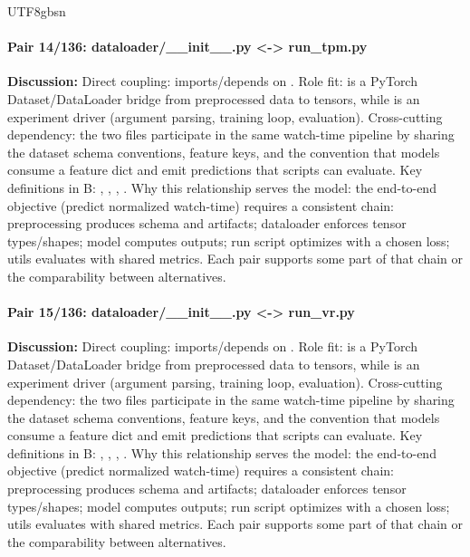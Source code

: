 \documentclass[11pt]{article}
\begin{document}
\begin{CJK*}{UTF8}{gbsn}
\paragraph{Pair 14/136: dataloader/\_\_init\_\_.py <-> run\_tpm.py}
\textbf{Discussion:} Direct coupling: \texttt{} imports/depends on \texttt{}. Role fit: \texttt{} is a PyTorch Dataset/DataLoader bridge from preprocessed data to tensors, while \texttt{} is an experiment driver (argument parsing, training loop, evaluation). Cross-cutting dependency: the two files participate in the same watch-time pipeline by sharing the dataset schema conventions, feature keys, and the convention that models consume a feature dict and emit predictions that scripts can evaluate. Key definitions in B: \texttt{}, \texttt{}, \texttt{}, \texttt{}. Why this relationship serves the model: the end-to-end objective (predict normalized watch-time) requires a consistent chain: preprocessing produces schema and artifacts; dataloader enforces tensor types/shapes; model computes outputs; run script optimizes with a chosen loss; utils evaluates with shared metrics. Each pair supports some part of that chain or the comparability between alternatives.

\paragraph{Pair 15/136: dataloader/\_\_init\_\_.py <-> run\_vr.py}
\textbf{Discussion:} Direct coupling: \texttt{} imports/depends on \texttt{}. Role fit: \texttt{} is a PyTorch Dataset/DataLoader bridge from preprocessed data to tensors, while \texttt{} is an experiment driver (argument parsing, training loop, evaluation). Cross-cutting dependency: the two files participate in the same watch-time pipeline by sharing the dataset schema conventions, feature keys, and the convention that models consume a feature dict and emit predictions that scripts can evaluate. Key definitions in B: \texttt{}, \texttt{}, \texttt{}, \texttt{}. Why this relationship serves the model: the end-to-end objective (predict normalized watch-time) requires a consistent chain: preprocessing produces schema and artifacts; dataloader enforces tensor types/shapes; model computes outputs; run script optimizes with a chosen loss; utils evaluates with shared metrics. Each pair supports some part of that chain or the comparability between alternatives.


\end{CJK*}
\end{document}
